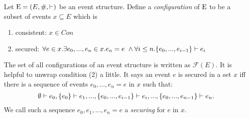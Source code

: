 \begin{definition}[Configuration]
    \label{conf}
    Let $\mathrm{E} = (E,\#,\vdash)$ be an event structure.
    Define a \textit{configuration} of $\mathrm{E}$ to be a subset of events $x \subseteq E$ which is
    \begin{enumerate}
        \item consistent: $x \in Con$
        \item secured: $\forall e \in x. \exists e_0,...,e_n \in x. e_n = e \ \wedge
                  \forall i \leq n. \{e_0,...,e_{i-1}\} \vdash e_i$
    \end{enumerate}
\end{definition}
\noindent The set of all configurations of an event structure is written as $\mathcal{F}(E)$.
It is helpful to unwrap condition (2) a little. It says an event $e$ is secured in a set $x$
iff there is a sequence of events $e_0,...,e_n = e$ in $x$ such that:
\begin{align*}
    \emptyset \vdash e_0, \{e_0\} \vdash e_1, ..., \{e_0,...,e_{i-1}\} \vdash e_i,...,
    \{e_0,...,e_{n-1}\} \vdash e_n.
\end{align*}
We call such a sequence $e_0,e_1,...,e_n = e$ a \emph{securing} for $e$ in $x$.

